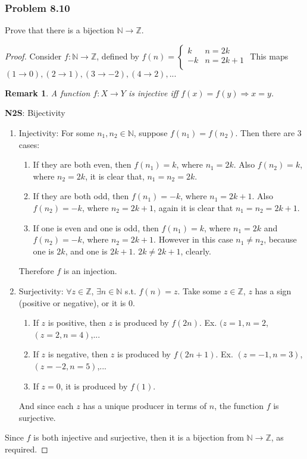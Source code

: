 \documentclass[hidelinks,12pt]{article}
\newtheorem*{remark}{Remark}
\newcommand{\N}{\mathbb{N}}
\newcommand{\Z}{\mathbb{Z}}
\begin{document}
\subsubsection{Problem 8.10}
Prove that there is a bijection $\N\to\Z$.
\begin{proof}
Consider $f:\N\to\Z$, defined by $f(n)=
\left\{
\begin{array}{ll}
      k & n=2k\\
      -k & n=2k+1\\
\end{array}\right.$
\newline This maps $(1\to0),(2\to1),(3\to-2),(4\to2),...$
\begin{remark}
A function $f:X\to Y$ is injective iff $f(x)=f(y)\Longrightarrow x=y$.
\end{remark}
\textbf{N2S}: Bijectivity \begin{enumerate}
    \item Injectivity: For some $n_1,n_2\in\N$, suppose $f(n_1)=f(n_2)$. Then there are 3 cases:
    \begin{enumerate}
        \item If they are both even, then $f(n_1)=k$, where $n_1=2k$. Also $f(n_2)=k$, where $n_2=2k$, it is clear that, $n_1=n_2=2k$.
        \item If they are both odd, then $f(n_1)=-k$, where $n_1=2k+1$. Also $f(n_2)=-k$, where $n_2=2k+1$, again it is clear that $n_1=n_2=2k+1$.
        \item If one is even and one is odd, then $f(n_1)=k$, where $n_1=2k$ and $f(n_2)=-k$, where $n_2=2k+1$. However in this case $n_1\neq n_2$, because one is $2k$, and one is $2k+1$. $2k\neq2k+1$, clearly. \scalebox{1.5}{\Lightning}
    \end{enumerate}
Therefore $f$ is an injection.
    \item Surjectivity: $\forall z\in\Z$, $\exists n\in\N$ s.t. $f(n)=z$. Take some $z\in\Z$, $z$ has a sign (positive or negative), or it is 0. \begin{enumerate}
        \item If $z$ is positive, then $z$ is produced by $f(2n)$. Ex. $(z=1,n=2$, $(z=2,n=4)$,...
        \item If $z$ is negative, then $z$ is produced by $f(2n+1)$. Ex. $(z=-1,n=3)$, $(z=-2,n=5)$,...
        \item If $z=0$, it is produced by $f(1)$.
    \end{enumerate}
    And since each $z$ has a unique producer in terms of $n$, the function $f$ is surjective.
\end{enumerate}
Since $f$ is both injective and surjective, then it is a bijection from $\N\to\Z$, as required.
\end{proof}
\newpage
\end{document}
